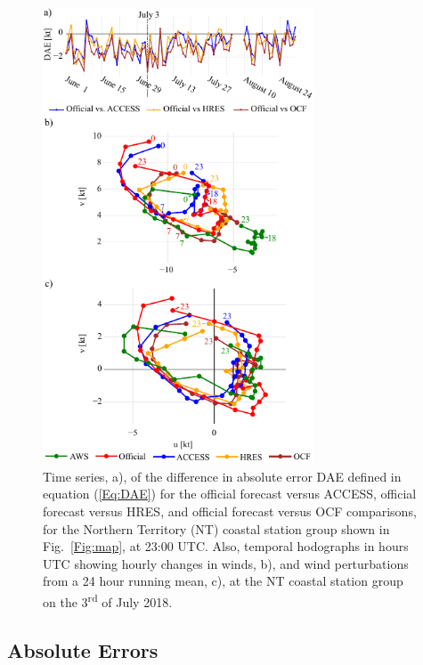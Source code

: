 \documentclass{ametsoc}
\begin{document}
\begin{figure}
\centering
\includegraphics[width=19pc]{case_studies_nt.pdf}
\caption{Time series, a), of the difference in absolute error DAE defined in equation (\ref{Eq:DAE}) for the official forecast versus ACCESS, official forecast versus HRES, and official forecast versus OCF comparisons, for the Northern Territory (NT) coastal station group shown in Fig.~\ref{Fig:map}, at 23:00 UTC. Also, temporal hodographs in hours UTC showing hourly changes in winds, b), and wind perturbations from a 24 hour running mean, c), at the NT coastal station group on the 3\textsuperscript{rd} of July 2018.}
\label{Fig:case_studies_nt}
\end{figure}

\subsection{Absolute Errors}
\label{Sec:Daily}
\end{document}
